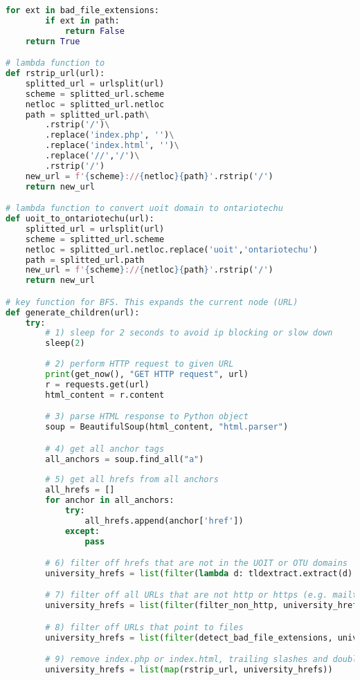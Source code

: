 \begin{lstlisting}[language=Python]
    for ext in bad_file_extensions:
        if ext in path:
            return False
    return True

# lambda function to 
def rstrip_url(url):
    splitted_url = urlsplit(url)
    scheme = splitted_url.scheme
    netloc = splitted_url.netloc
    path = splitted_url.path\
        .rstrip('/')\
        .replace('index.php', '')\
        .replace('index.html', '')\
        .replace('//','/')\
        .rstrip('/')
    new_url = f'{scheme}://{netloc}{path}'.rstrip('/')
    return new_url

# lambda function to convert uoit domain to ontariotechu
def uoit_to_ontariotechu(url):
    splitted_url = urlsplit(url)
    scheme = splitted_url.scheme
    netloc = splitted_url.netloc.replace('uoit','ontariotechu')
    path = splitted_url.path
    new_url = f'{scheme}://{netloc}{path}'.rstrip('/')
    return new_url

# key function for BFS. This expands the current node (URL)
def generate_children(url):
    try:
        # 1) sleep for 2 seconds to avoid ip blocking or slow down
        sleep(2)
        
        # 2) perform HTTP request to given URL
        print(get_now(), "GET HTTP request", url)
        r = requests.get(url)
        html_content = r.content

        # 3) parse HTML response to Python object
        soup = BeautifulSoup(html_content, "html.parser")

        # 4) get all anchor tags
        all_anchors = soup.find_all("a")
        
        # 5) get all hrefs from all anchors
        all_hrefs = []
        for anchor in all_anchors:
            try:
                all_hrefs.append(anchor['href'])
            except:
                pass

        # 6) filter off hrefs that are not in the UOIT or OTU domains
        university_hrefs = list(filter(lambda d: tldextract.extract(d).domain in university_domains, all_hrefs))

        # 7) filter off all URLs that are not http or https (e.g. mailto)
        university_hrefs = list(filter(filter_non_http, university_hrefs))

        # 8) filter off URLs that point to files
        university_hrefs = list(filter(detect_bad_file_extensions, university_hrefs))

        # 9) remove index.php or index.html, trailing slashes and double slashes
        university_hrefs = list(map(rstrip_url, university_hrefs))


\end{lstlisting}

